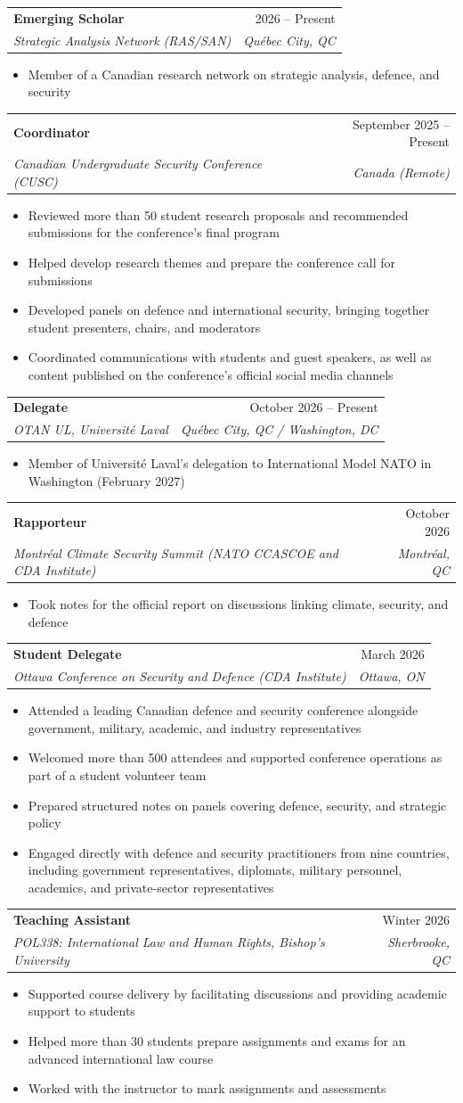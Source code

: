 \documentclass[letterpaper,10.5pt]{article}
\newcommand{\entry}[4]{%
  \item
  \begin{tabularx}{\linewidth}{X r}
    \textbf{#1} & \color{grisfonce}#2 \\
    \textit{#3} & \textit{\small\color{grisfonce}#4} \\
  \end{tabularx}\vspace{-6pt}
}
\newcommand{\point}[1]{\item\small{#1}\vspace{-2pt}}
\newcommand{\pointsStart}{\begin{itemize}[leftmargin=0.2in, label={\color{royal}\textbullet}]}
\newcommand{\pointsEnd}{\end{itemize}\vspace{-4pt}}
\begin{document}
  \entry{Emerging Scholar}{2026 -- Present}
        {Strategic Analysis Network (RAS/SAN)}{Québec City, QC}
  \pointsStart
    \point{Member of a Canadian research network on strategic analysis, defence, and security}
  \pointsEnd

  \entry{Coordinator}{September 2025 -- Present}
        {Canadian Undergraduate Security Conference (CUSC)}{Canada (Remote)}
  \pointsStart
    \point{Reviewed more than 50 student research proposals and recommended submissions for the conference's final program}
    \point{Helped develop research themes and prepare the conference call for submissions}
    \point{Developed panels on defence and international security, bringing together student presenters, chairs, and moderators}
    \point{Coordinated communications with students and guest speakers, as well as content published on the conference's official social media channels}
  \pointsEnd

  \entry{Delegate}{October 2026 -- Present}
        {OTAN UL, Université Laval}{Québec City, QC / Washington, DC}
  \pointsStart
    \point{Member of Université Laval's delegation to International Model NATO in Washington (February 2027)}
  \pointsEnd

  \entry{Rapporteur}{October 2026}
        {Montréal Climate Security Summit (NATO CCASCOE and CDA Institute)}{Montréal, QC}
  \pointsStart
    \point{Took notes for the official report on discussions linking climate, security, and defence}
  \pointsEnd

  \entry{Student Delegate}{March 2026}
        {Ottawa Conference on Security and Defence (CDA Institute)}{Ottawa, ON}
  \pointsStart
    \point{Attended a leading Canadian defence and security conference alongside government, military, academic, and industry representatives}
    \point{Welcomed more than 500 attendees and supported conference operations as part of a student volunteer team}
    \point{Prepared structured notes on panels covering defence, security, and strategic policy}
    \point{Engaged directly with defence and security practitioners from nine countries, including government representatives, diplomats, military personnel, academics, and private-sector representatives}
  \pointsEnd

  \entry{Teaching Assistant}{Winter 2026}
        {POL338: International Law and Human Rights, Bishop's University}{Sherbrooke, QC}
  \pointsStart
    \point{Supported course delivery by facilitating discussions and providing academic support to students}
    \point{Helped more than 30 students prepare assignments and exams for an advanced international law course}
    \point{Worked with the instructor to mark assignments and assessments}
  \pointsEnd
\end{document}
